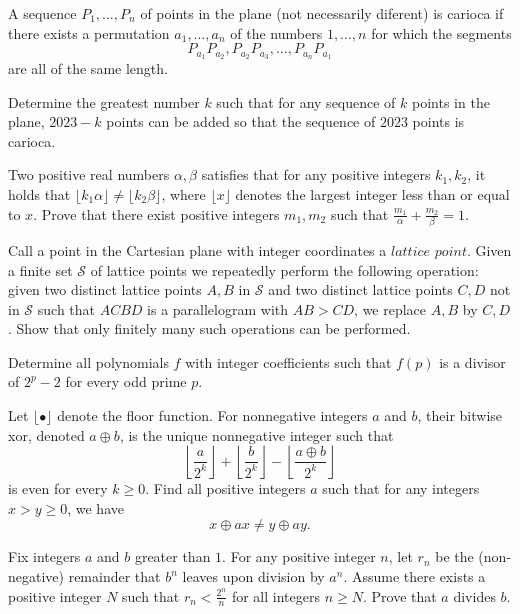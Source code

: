 \documentclass[11pt]{scrartcl}
\begin{document}
\begin{problem}[3707562559770315754]
	A sequence $P_1, \dots, P_n$ of points in the plane (not necessarily diferent) is carioca if there exists a permutation $a_1, \dots, a_n$ of the numbers $1, \dots, n$ for which the segments
$$P_{a_1}P_{a_2}, P_{a_2}P_{a_3}, \dots, P_{a_n}P_{a_1}$$are all of the same length.

Determine the greatest number $k$ such that for any sequence of $k$ points in the plane, $2023-k$ points can be added so that the sequence of $2023$ points is carioca.
\end{problem}
\begin{problem}[3713773607632901861]
Two positive real numbers $\alpha, \beta$ satisfies that for any positive integers $k_1,k_2$, it holds that $\lfloor k_1 \alpha \rfloor \neq \lfloor k_2 \beta \rfloor$, where $\lfloor x \rfloor$ denotes the largest integer less than or equal to $x$. Prove that there exist positive integers $m_1,m_2$ such that $\frac{m_1}{\alpha}+\frac{m_2}{\beta}=1$.
\end{problem}
\begin{problem}[3744894000085761569]
Call a point in the Cartesian plane with integer coordinates a $lattice$ $point$. Given a finite set $\mathcal{S}$ of lattice points we repeatedly perform the following operation: given two distinct lattice points $A, B$ in $\mathcal{S}$ and two distinct lattice points $C, D$ not in $\mathcal{S}$ such that $ACBD$ is a parallelogram with $AB > CD$, we replace $A, B$ by $C, D$. Show that only finitely many such operations can be performed.
\end{problem}
\begin{problem}[3753289685429929419]
Determine all polynomials $f$ with integer coefficients such that $f(p)$ is a divisor of $2^p-2$ for every odd prime $p$.
\end{problem}
\begin{problem}[3780160396229984886]
	Let $\lfloor \bullet \rfloor$ denote the floor function. For nonnegative integers $a$ and $b$, their bitwise xor, denoted $a \oplus b$, is the unique nonnegative integer such that$$ \left \lfloor \frac{a}{2^k}  \right \rfloor+ \left\lfloor\frac{b}{2^k} \right\rfloor - \left\lfloor \frac{a\oplus b}{2^k}\right\rfloor$$is even for every $k \ge 0$. Find all positive integers $a$ such that for any integers $x>y\ge 0$, we have\[ x\oplus ax \neq y \oplus ay. \]
\end{problem}
\begin{problem}[3812208515075577730]
Fix integers $a$ and $b$ greater than $1$. For any positive integer $n$, let $r_n$ be the (non-negative) remainder that $b^n$ leaves upon division by $a^n$. Assume there exists a positive integer $N$ such that $r_n < \frac{2^n}{n}$ for all integers $n\geq N$. Prove that $a$ divides $b$.
\end{problem}
\end{document}
